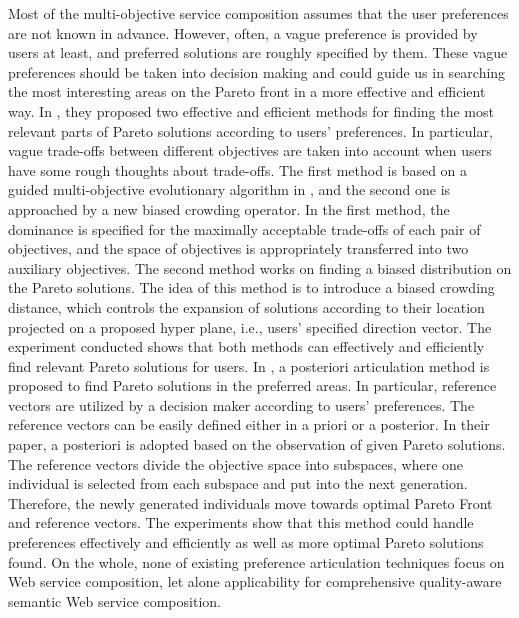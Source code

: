 Most of the multi-objective service composition assumes that the user preferences are not known in advance. However,  often, a vague preference is provided by users at least, and preferred solutions are roughly specified by them.  These vague preferences should be taken into decision making and could guide us in searching the most interesting areas on the Pareto front in a more effective and efficient way. In \cite{branke2005integrating}, they proposed two effective and efficient methods for finding the most relevant parts of Pareto solutions according to users' preferences. In particular, vague trade-offs between different objectives are taken into account when users have some rough thoughts about trade-offs.  The first method is based on a guided multi-objective evolutionary algorithm in \cite{branke2001guidance}, and the second one is approached by a new biased crowding operator. In the first method, the dominance is specified for the maximally acceptable trade-offs of each pair of objectives, and the space of objectives is appropriately transferred into two auxiliary objectives. The second method works on finding a biased distribution on the Pareto solutions. The idea of this method is to introduce a biased crowding distance, which controls the expansion of solutions according to their location projected on a proposed hyper plane, i.e., users' specified direction vector.  The experiment conducted shows that both methods can effectively and efficiently find relevant Pareto solutions for users. In \cite{cheng2015reference}, a posteriori articulation method is proposed to find Pareto solutions in the preferred areas. In particular, reference vectors are utilized by a decision maker according to users' preferences. The reference vectors can be easily defined either in a priori or a posterior. In their paper, a posteriori is adopted based on the observation of given Pareto solutions. The reference vectors divide the objective space into subspaces, where one individual is selected from each subspace and put into the next generation. Therefore, the newly generated individuals move towards optimal Pareto Front and reference vectors. The experiments show that this method could handle preferences effectively and efficiently as well as more optimal Pareto solutions found. On the whole, none of existing preference articulation techniques focus on Web service composition, let alone applicability for comprehensive quality-aware semantic Web service composition. 



